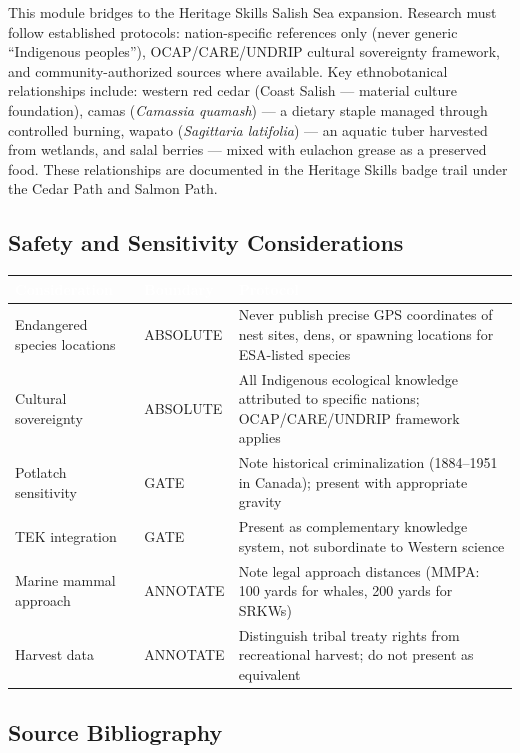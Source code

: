 \documentclass[11pt,letterpaper]{article}
\newcommand{\tableheader}[1]{\textbf{\sffamily\textcolor{white}{#1}}}
\begin{document}
This module bridges to the Heritage Skills Salish Sea expansion. Research must follow established protocols: nation-specific references only (never generic ``Indigenous peoples''), OCAP/CARE/UNDRIP cultural sovereignty framework, and community-authorized sources where available. Key ethnobotanical relationships include: western red cedar (Coast Salish --- material culture foundation), camas (\emph{Camassia quamash}) --- a dietary staple managed through controlled burning, wapato (\emph{Sagittaria latifolia}) --- an aquatic tuber harvested from wetlands, and salal berries --- mixed with eulachon grease as a preserved food. These relationships are documented in the Heritage Skills badge trail under the Cedar Path and Salmon Path.

\subsection{Safety and Sensitivity Considerations}

\begin{center}
\begin{tabularx}{\textwidth}{L{3.5cm}C{2cm}X}
\toprule
{}
\tableheader{Consideration} & \tableheader{Boundary} & \tableheader{Protocol} \\
\midrule
Endangered species locations & ABSOLUTE & Never publish precise GPS coordinates of nest sites, dens, or spawning locations for ESA-listed species \\
Cultural sovereignty & ABSOLUTE & All Indigenous ecological knowledge attributed to specific nations; OCAP/CARE/UNDRIP framework applies \\
Potlatch sensitivity & GATE & Note historical criminalization (1884--1951 in Canada); present with appropriate gravity \\
TEK integration & GATE & Present as complementary knowledge system, not subordinate to Western science \\
Marine mammal approach & ANNOTATE & Note legal approach distances (MMPA: 100 yards for whales, 200 yards for SRKWs) \\
Harvest data & ANNOTATE & Distinguish tribal treaty rights from recreational harvest; do not present as equivalent \\
\bottomrule
\end{tabularx}
\end{center}

\subsection{Source Bibliography}
\end{document}
